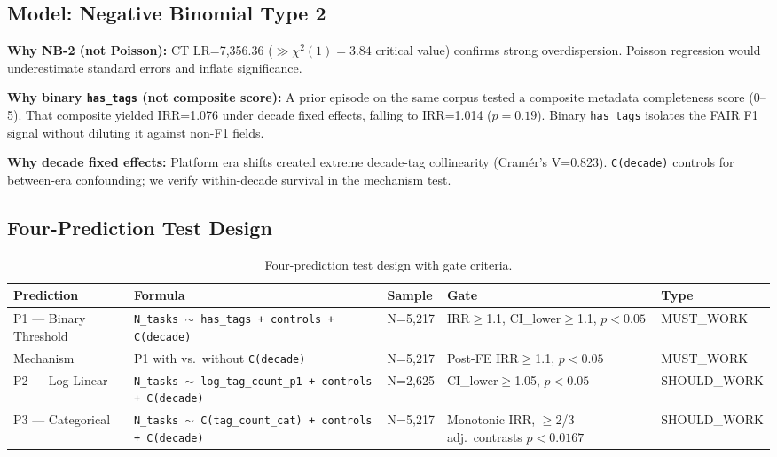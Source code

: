 \subsection{Model: Negative Binomial Type 2}

\textbf{Why NB-2 (not Poisson):} CT LR=7,356.36 ($\gg \chi^2(1)=3.84$ critical value) confirms strong overdispersion. Poisson regression would underestimate standard errors and inflate significance.

\textbf{Why binary \texttt{has\_tags} (not composite score):} A prior episode on the same corpus tested a composite metadata completeness score (0--5). That composite yielded IRR=1.076 under decade fixed effects, falling to IRR=1.014 ($p=0.19$). Binary \texttt{has\_tags} isolates the FAIR F1 signal without diluting it against non-F1 fields.

\textbf{Why decade fixed effects:} Platform era shifts created extreme decade-tag collinearity (Cram\'er's V=0.823). \texttt{C(decade)} controls for between-era confounding; we verify within-decade survival in the mechanism test.

\subsection{Four-Prediction Test Design}

\begin{table}[h]
\centering
\caption{Four-prediction test design with gate criteria.}
\label{tab:predictions}
\begin{tabular}{lllll}
\toprule
Prediction & Formula & Sample & Gate & Type \\
\midrule
P1 --- Binary Threshold & \texttt{N\_tasks $\sim$ has\_tags + controls + C(decade)} & N=5,217 & IRR$\geq$1.1, CI\_lower$\geq$1.1, $p<0.05$ & MUST\_WORK \\
Mechanism & P1 with vs.\ without \texttt{C(decade)} & N=5,217 & Post-FE IRR$\geq$1.1, $p<0.05$ & MUST\_WORK \\
P2 --- Log-Linear & \texttt{N\_tasks $\sim$ log\_tag\_count\_p1 + controls + C(decade)} & N=2,625 & CI\_lower$\geq$1.05, $p<0.05$ & SHOULD\_WORK \\
P3 --- Categorical & \texttt{N\_tasks $\sim$ C(tag\_count\_cat) + controls + C(decade)} & N=5,217 & Monotonic IRR, $\geq$2/3 adj.\ contrasts $p<0.0167$ & SHOULD\_WORK \\
\bottomrule
\end{tabular}
\end{table}

